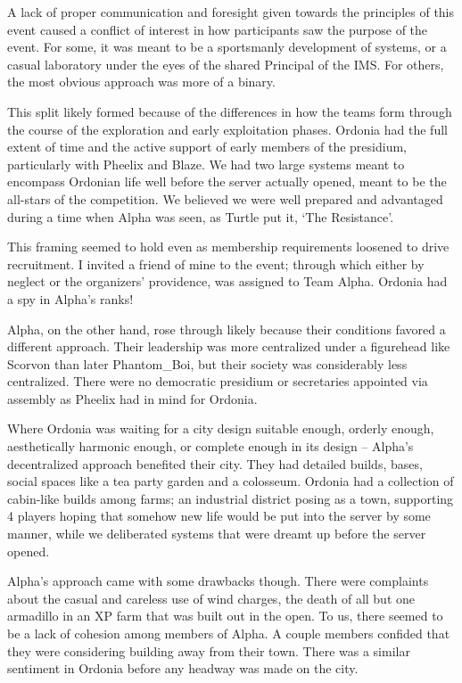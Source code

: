 A lack of proper communication and foresight given towards the principles of this event caused a conflict of interest in how participants saw the purpose of the event. For some, it was meant to be a sportsmanly development of systems, or a casual laboratory under the eyes of the shared Principal of the IMS. For others, the most obvious approach was more of a binary.

This split likely formed because of the differences in how the teams form through the course of the exploration and early exploitation phases. Ordonia had the full extent of time and the active support of early members of the presidium, particularly with Pheelix and Blaze. We had two large systems meant to encompass Ordonian life well before the server actually opened, meant to be the all-stars of the competition. We believed we were well prepared and advantaged during a time when Alpha was seen, as Turtle put it, `The Resistance'.

This framing seemed to hold even as membership requirements loosened to drive recruitment. I invited a friend of mine to the event; through which either by neglect or the organizers' providence, was assigned to Team Alpha. Ordonia had a spy in Alpha's ranks!

Alpha, on the other hand, rose through likely because their conditions favored a different approach. Their leadership was more centralized under a figurehead like Scorvon than later Phantom\_Boi, but their society was considerably less centralized. There were no democratic presidium or secretaries appointed via assembly as Pheelix had in mind for Ordonia.

Where Ordonia was waiting for a city design suitable enough, orderly enough, aesthetically harmonic enough, or complete enough in its design – Alpha's decentralized approach benefited their city. They had detailed builds, bases, social spaces like a tea party garden and a colosseum. Ordonia had a collection of cabin-like builds among farms; an industrial district posing as a town, supporting 4 players hoping that somehow new life would be put into the server by some manner, while we deliberated systems that were dreamt up before the server opened.

Alpha's approach came with some drawbacks though. There were complaints about the casual and careless use of wind charges, the death of all but one armadillo in an XP farm that was built out in the open. To us, there seemed to be a lack of cohesion among members of Alpha. A couple members confided that they were considering building away from their town. There was a similar sentiment in Ordonia before any headway was made on the city.

